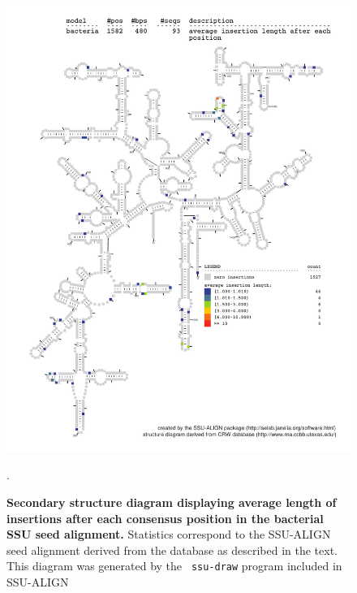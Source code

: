 \begin{figure}
\begin{center}
\includegraphics[width=5.64in]{Figures/bacteria-0p1-iavglen}
\end{center}
\caption[Secondary structure diagram displaying average length of insertions
  after each consensus position in the bacterial SSU seed
  alignment]{\textbf{Secondary structure diagram displaying average
    length of insertions after each consensus position in the bacterial SSU seed
  alignment.} Statistics correspond to the SSU-ALIGN seed
  alignment derived from the  database \cite{CannoneGutell02}
  as described in the text. This diagram was generated by the {\tt
  ssu-draw} program included in SSU-ALIGN}.
\label{fig:baciavglen}
\end{figure}


